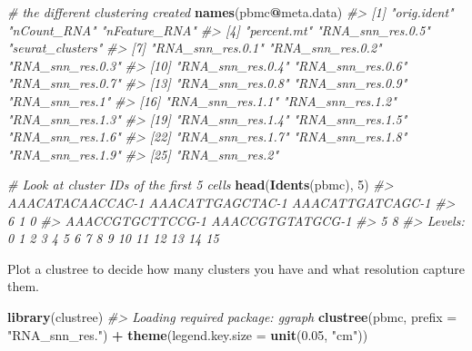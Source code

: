 \documentclass[
]{book}
\newenvironment{Shaded}{\begin{snugshade}}{\end{snugshade}}
\newcommand{\AttributeTok}[1]{\textcolor[rgb]{0.13,0.29,0.53}{#1}}
\newcommand{\CommentTok}[1]{\textcolor[rgb]{0.56,0.35,0.01}{\textit{#1}}}
\newcommand{\DecValTok}[1]{\textcolor[rgb]{0.00,0.00,0.81}{#1}}
\newcommand{\FloatTok}[1]{\textcolor[rgb]{0.00,0.00,0.81}{#1}}
\newcommand{\FunctionTok}[1]{\textcolor[rgb]{0.13,0.29,0.53}{\textbf{#1}}}
\newcommand{\NormalTok}[1]{#1}
\newcommand{\SpecialCharTok}[1]{\textcolor[rgb]{0.81,0.36,0.00}{\textbf{#1}}}
\newcommand{\StringTok}[1]{\textcolor[rgb]{0.31,0.60,0.02}{#1}}
\begin{document}
\begin{Shaded}
\begin{Highlighting}[]
\CommentTok{\# the different clustering created}
\FunctionTok{names}\NormalTok{(pbmc}\SpecialCharTok{@}\NormalTok{meta.data)}
\CommentTok{\#\textgreater{}  [1] "orig.ident"      "nCount\_RNA"      "nFeature\_RNA"   }
\CommentTok{\#\textgreater{}  [4] "percent.mt"      "RNA\_snn\_res.0.5" "seurat\_clusters"}
\CommentTok{\#\textgreater{}  [7] "RNA\_snn\_res.0.1" "RNA\_snn\_res.0.2" "RNA\_snn\_res.0.3"}
\CommentTok{\#\textgreater{} [10] "RNA\_snn\_res.0.4" "RNA\_snn\_res.0.6" "RNA\_snn\_res.0.7"}
\CommentTok{\#\textgreater{} [13] "RNA\_snn\_res.0.8" "RNA\_snn\_res.0.9" "RNA\_snn\_res.1"  }
\CommentTok{\#\textgreater{} [16] "RNA\_snn\_res.1.1" "RNA\_snn\_res.1.2" "RNA\_snn\_res.1.3"}
\CommentTok{\#\textgreater{} [19] "RNA\_snn\_res.1.4" "RNA\_snn\_res.1.5" "RNA\_snn\_res.1.6"}
\CommentTok{\#\textgreater{} [22] "RNA\_snn\_res.1.7" "RNA\_snn\_res.1.8" "RNA\_snn\_res.1.9"}
\CommentTok{\#\textgreater{} [25] "RNA\_snn\_res.2"}

\CommentTok{\# Look at cluster IDs of the first 5 cells}
\FunctionTok{head}\NormalTok{(}\FunctionTok{Idents}\NormalTok{(pbmc), }\DecValTok{5}\NormalTok{)}
\CommentTok{\#\textgreater{} AAACATACAACCAC{-}1 AAACATTGAGCTAC{-}1 AAACATTGATCAGC{-}1 }
\CommentTok{\#\textgreater{}                6                1                0 }
\CommentTok{\#\textgreater{} AAACCGTGCTTCCG{-}1 AAACCGTGTATGCG{-}1 }
\CommentTok{\#\textgreater{}                5                8 }
\CommentTok{\#\textgreater{} Levels: 0 1 2 3 4 5 6 7 8 9 10 11 12 13 14 15}
\end{Highlighting}
\end{Shaded}

Plot a clustree to decide how many clusters you have and what resolution capture them.

\begin{Shaded}
\begin{Highlighting}[]
\FunctionTok{library}\NormalTok{(clustree)}
\CommentTok{\#\textgreater{} Loading required package: ggraph}
\FunctionTok{clustree}\NormalTok{(pbmc, }\AttributeTok{prefix =} \StringTok{"RNA\_snn\_res."}\NormalTok{) }\SpecialCharTok{+} \FunctionTok{theme}\NormalTok{(}\AttributeTok{legend.key.size =} \FunctionTok{unit}\NormalTok{(}\FloatTok{0.05}\NormalTok{, }\StringTok{"cm"}\NormalTok{))}
\end{Highlighting}
\end{Shaded}
\end{document}
